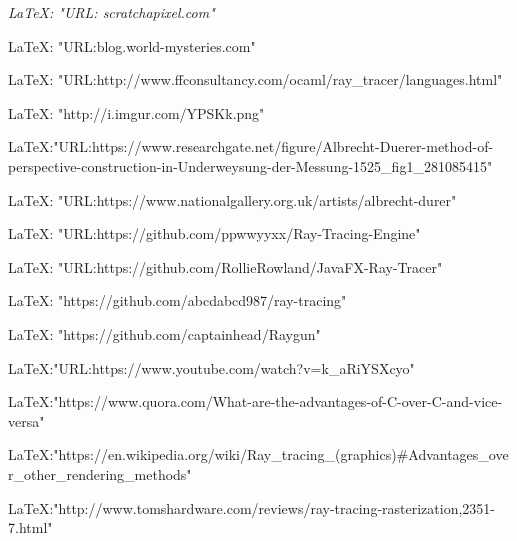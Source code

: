 \documentclass{article}
\begin{document}
\begin{thebibliography}{9}

  \textit{\LaTeX: "URL: scratchapixel.com"}
  
{\LaTeX: "URL:blog.world-mysteries.com"}
  

{\LaTeX: "URL:http://www.ffconsultancy.com/ocaml/ray_tracer/languages.html"}

{\LaTeX: "http://i.imgur.com/YPSKk.png"}

{\LaTeX:"URL:https://www.researchgate.net/figure/Albrecht-Duerer-method-of-perspective-construction-in-Underweysung-der-Messung-1525_fig1_281085415"}

{\LaTeX: "URL:https://www.nationalgallery.org.uk/artists/albrecht-durer"}


 {\LaTeX: "URL:https://github.com/ppwwyyxx/Ray-Tracing-Engine"}

 {\LaTeX: "URL:https://github.com/RollieRowland/JavaFX-Ray-Tracer"}

 {\LaTeX: "https://github.com/abcdabcd987/ray-tracing"}

 {\LaTeX: "https://github.com/captainhead/Raygun"}

{\LaTeX:"URL:https://www.youtube.com/watch?v=k_aRiYSXcyo"}

{\LaTeX:"https://www.quora.com/What-are-the-advantages-of-C-over-C-and-vice-versa"}


{\LaTeX:"https://en.wikipedia.org/wiki/Ray_tracing_(graphics)#Advantages_over_other_rendering_methods"}

{\LaTeX:"http://www.tomshardware.com/reviews/ray-tracing-rasterization,2351-7.html"}


\end{thebibliography}
\end{document}
